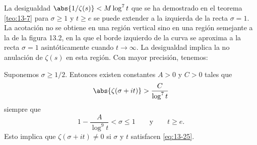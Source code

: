     La desigualdad $\abs{1/\zeta(s)}<M\log^7t$ que se ha demostrado en el teorema
    \ref{teo:13-7} para $\sigma\geq1$ y $t\geq e$ se puede extender a la izquierda de la recta
    $\sigma=1$. La acotación no se obtiene en una región vertical sino en una región semejante
    a la de la figura 13.2, en la que el borde izquierdo de la curva se aproxima a la recta
    $\sigma=1$ asintóticamente cuando $t\to\infty$. La desigualdad implica la no anulación de
    $\zeta(s)$ en esta región. Con mayor precisión, tenemos:

    \begin{teorema}\label{teo:13-10}
        Suponemos $\sigma\geq1/2$. Entonces existen constantes $A>0$ y $C>0$ tales que
        \begin{equation*}
            \abs{\zeta(\sigma+it)}>\frac{C}{\log^7t}
        \end{equation*}
        siempre que
        \begin{equation}\label{eq:13-25}
            1-\frac{A}{\log^9t}<\sigma\leq1\qquad\text{y}\qquad t\geq e.
        \end{equation}
        Esto implica que $\zeta(\sigma+it)\neq0$ si $\sigma$ y $t$ satisfacen \eqref{eq:13-25}.
    \end{teorema}


